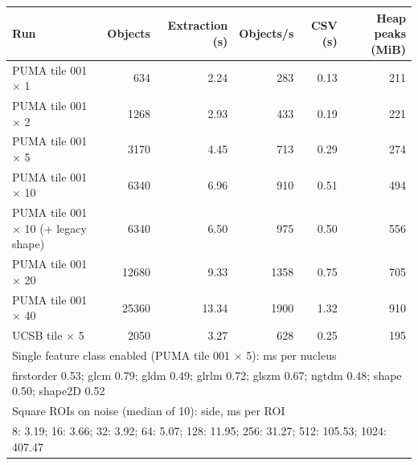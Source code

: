 \begin{tabular}{lrrrrr}
\toprule
Run & Objects & Extraction (s) & Objects/s & CSV (s) & Heap peaks (MiB) \\
\midrule
PUMA tile 001 $\times$ 1 & 634 & 2.24 & 283 & 0.13 & 211 \\
PUMA tile 001 $\times$ 2 & 1268 & 2.93 & 433 & 0.19 & 221 \\
PUMA tile 001 $\times$ 5 & 3170 & 4.45 & 713 & 0.29 & 274 \\
PUMA tile 001 $\times$ 10 & 6340 & 6.96 & 910 & 0.51 & 494 \\
PUMA tile 001 $\times$ 10 (+ legacy shape) & 6340 & 6.50 & 975 & 0.50 & 556 \\
PUMA tile 001 $\times$ 20 & 12680 & 9.33 & 1358 & 0.75 & 705 \\
PUMA tile 001 $\times$ 40 & 25360 & 13.34 & 1900 & 1.32 & 910 \\
UCSB tile $\times$ 5 & 2050 & 3.27 & 628 & 0.25 & 195 \\
\midrule
\multicolumn{6}{l}{Single feature class enabled (PUMA tile 001 $\times$ 5): ms per nucleus} \\
\multicolumn{6}{l}{firstorder 0.53; glcm 0.79; gldm 0.49; glrlm 0.72; glszm 0.67; ngtdm 0.48; shape 0.50; shape2D 0.52} \\
\midrule
\multicolumn{6}{l}{Square ROIs on noise (median of 10): side, ms per ROI} \\
\multicolumn{6}{l}{8: 3.19; 16: 3.66; 32: 3.92; 64: 5.07; 128: 11.95; 256: 31.27; 512: 105.53; 1024: 407.47} \\
\bottomrule
\end{tabular}
